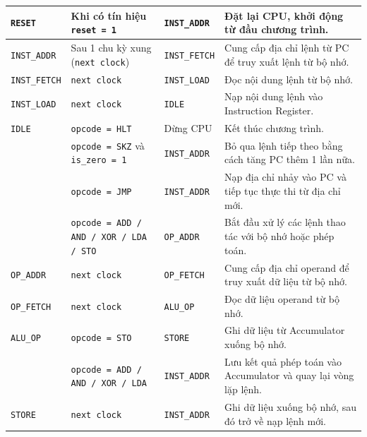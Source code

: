 \begin{longtable}{|p{}|p{}|p{}|p{}|}
            \texttt{RESET} & Khi có tín hiệu \texttt{reset = 1} & \texttt{INST\_ADDR} & Đặt lại CPU, khởi động từ đầu chương trình. \\
            \hline
            \texttt{INST\_ADDR} & Sau 1 chu kỳ xung (\texttt{next clock}) & \texttt{INST\_FETCH} & Cung cấp địa chỉ lệnh từ PC để truy xuất lệnh từ bộ nhớ. \\
            \hline
            \texttt{INST\_FETCH} & \texttt{next clock} & \texttt{INST\_LOAD} & Đọc nội dung lệnh từ bộ nhớ. \\
            \hline
            \texttt{INST\_LOAD} & \texttt{next clock} & \texttt{IDLE} & Nạp nội dung lệnh vào Instruction Register. \\
            \hline
            \texttt{IDLE} & \texttt{opcode = HLT} & Dừng CPU & Kết thúc chương trình. \\
            \cline{2-4}
            & \texttt{opcode = SKZ} và \texttt{is\_zero = 1} & \texttt{INST\_ADDR} & Bỏ qua lệnh tiếp theo bằng cách tăng PC thêm 1 lần nữa. \\
            \cline{2-4}
            & \texttt{opcode = JMP} & \texttt{INST\_ADDR} & Nạp địa chỉ nhảy vào PC và tiếp tục thực thi từ địa chỉ mới. \\
            \cline{2-4}
            & \texttt{opcode = ADD / AND / XOR / LDA / STO} & \texttt{OP\_ADDR} & Bắt đầu xử lý các lệnh thao tác với bộ nhớ hoặc phép toán. \\
            \hline
            \texttt{OP\_ADDR} & \texttt{next clock} & \texttt{OP\_FETCH} & Cung cấp địa chỉ operand để truy xuất dữ liệu từ bộ nhớ. \\
            \hline
            \texttt{OP\_FETCH} & \texttt{next clock} & \texttt{ALU\_OP} & Đọc dữ liệu operand từ bộ nhớ. \\
            \hline
            \texttt{ALU\_OP} & \texttt{opcode = STO} & \texttt{STORE} & Ghi dữ liệu từ Accumulator xuống bộ nhớ. \\
            \cline{2-4}
            & \texttt{opcode = ADD / AND / XOR / LDA} & \texttt{INST\_ADDR} & Lưu kết quả phép toán vào Accumulator và quay lại vòng lặp lệnh. \\
            \hline
            \texttt{STORE} & \texttt{next clock} & \texttt{INST\_ADDR} & Ghi dữ liệu xuống bộ nhớ, sau đó trở về nạp lệnh mới. \\
            \hline
        \end{longtable}